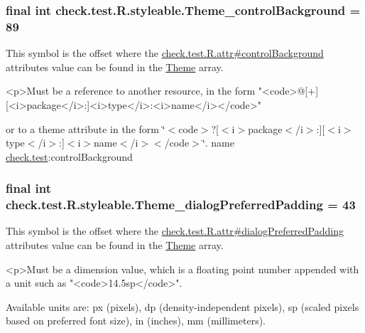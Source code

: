 \subsubsection[{Theme\+\_\+control\+Background}]{\setlength{\rightskip}{0pt plus 5cm}final int check.\+test.\+R.\+styleable.\+Theme\+\_\+control\+Background = 89\hspace{0.3cm}{\ttfamily [static]}}\label{classcheck_1_1test_1_1_r_1_1styleable_a8b78be6b3ea5c1a175341e08d853b1bd}
This symbol is the offset where the \hyperlink{classcheck_1_1test_1_1_r_1_1attr_a7aec8ace341918ac5a656918317fe5a6}{check.\+test.\+R.\+attr\#control\+Background} attribute\textquotesingle{}s value can be found in the \hyperlink{classcheck_1_1test_1_1_r_1_1styleable_acca726d02016a0cf607782ec3a436a81}{Theme} array.

\begin{DoxyVerb}      <p>Must be a reference to another resource, in the form "<code>@[+][<i>package</i>:]<i>type</i>:<i>name</i></code>"
\end{DoxyVerb}
 or to a theme attribute in the form \char`\"{}$<$code$>$?\mbox{[}$<$i$>$package$<$/i$>$\+:\mbox{]}\mbox{[}$<$i$>$type$<$/i$>$\+:\mbox{]}$<$i$>$name$<$/i$>$$<$/code$>$\char`\"{}.  name \hyperlink{namespacecheck_1_1test}{check.\+test}\+:control\+Background \hypertarget{classcheck_1_1test_1_1_r_1_1styleable_a49869154ae939603270f1df062f8b8f5}{}
\subsubsection[{Theme\+\_\+dialog\+Preferred\+Padding}]{\setlength{\rightskip}{0pt plus 5cm}final int check.\+test.\+R.\+styleable.\+Theme\+\_\+dialog\+Preferred\+Padding = 43\hspace{0.3cm}{\ttfamily [static]}}\label{classcheck_1_1test_1_1_r_1_1styleable_a49869154ae939603270f1df062f8b8f5}
This symbol is the offset where the \hyperlink{classcheck_1_1test_1_1_r_1_1attr_aff223408c80429ebea4398db50b9ff36}{check.\+test.\+R.\+attr\#dialog\+Preferred\+Padding} attribute\textquotesingle{}s value can be found in the \hyperlink{classcheck_1_1test_1_1_r_1_1styleable_acca726d02016a0cf607782ec3a436a81}{Theme} array.

\begin{DoxyVerb}      <p>Must be a dimension value, which is a floating point number appended with a unit such as "<code>14.5sp</code>".
\end{DoxyVerb}
 Available units are\+: px (pixels), dp (density-\/independent pixels), sp (scaled pixels based on preferred font size), in (inches), mm (millimeters). 

